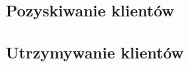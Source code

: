 \documentclass[12pt]{article}
\begin{document}

\subsection{Pozyskiwanie klientów}






\subsection{Utrzymywanie klientów}

\end{document}
